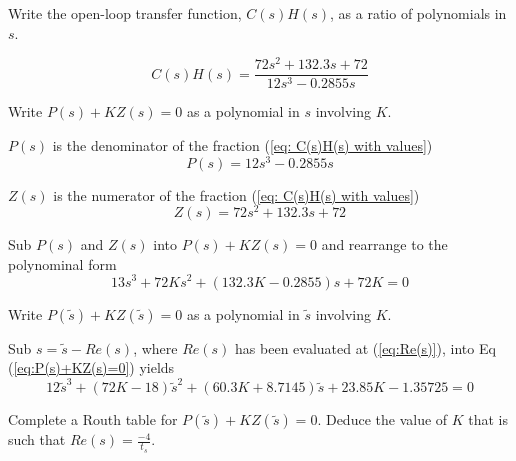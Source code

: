\begin{questions}
\begin{solution}
\end{solution}

\question[1H]
Write the open-loop transfer function, $C(s)H(s)$, as a ratio of polynomials in $s$.

\begin{solution}
   \begin{equation}\label{eq: C(s)H(s) with values}
   C(s)H(s) = \frac{72s^2 + 132.3s + 72}{12s^3 - 0.2855s}
   \end{equation}
\end{solution}

\question[1H]
Write $P(s) + KZ(s) = 0$ as a polynomial in $s$ involving $K$.

\begin{solution}
   $P(s)$ is the denominator of the fraction (\ref{eq: C(s)H(s) with values})
   \begin{equation*}
   P(s) = 12s^3 - 0.2855s
   \end{equation*}

   $Z(s)$ is the numerator of the fraction (\ref{eq: C(s)H(s) with values})
   \begin{equation*}
   Z(s) = 72s^2 + 132.3s + 72
   \end{equation*}

   Sub $P(s)$ and $Z(s)$ into $P(s) + KZ(s) = 0$ and rearrange to the polynominal form
   \begin{equation}\label{eq:P(s)+KZ(s)=0}
   13s^3 + 72Ks^2 + (132.3K-0.2855)s + 72K = 0
   \end{equation}
\end{solution}

\question[1H]
Write $P(\tilde{s})+KZ(\tilde{s}) = 0$ as a polynomial in $\tilde{s}$ involving $K$.

\begin{solution}
   Sub $s = \tilde{s} - Re(s)$, where $Re(s)$ has been evaluated at (\ref{eq:Re(s)}), into Eq (\ref{eq:P(s)+KZ(s)=0}) yields
   \begin{equation*}
   12\tilde{s}^3 + (72K-18)\tilde{s}^2 + (60.3K+8.7145)\tilde{s} + 23.85K - 1.35725 = 0
   \end{equation*}
\end{solution}

\newpage
\question[3H]
Complete a Routh table for $P(\tilde{s})+KZ(\tilde{s}) = 0$. Deduce the value of $K$ that is such that $Re(s) = \frac{-4}{t_s}$.


\end{questions}
